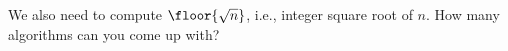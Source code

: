   We also need to compute $\floor{\sqrt{n}}$, i.e., integer square root
  of $n$.
  How many algorithms can you come up with?
